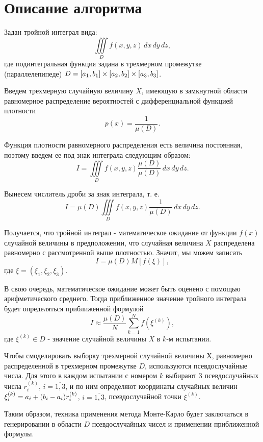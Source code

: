 \documentclass{report}
\begin{document}
\section*{Описание алгоритма}
\par Задан тройной интеграл вида:
$$\iiint\limits_D f(x,y,z) \,dx\,dy\,dz, $$
где подинтегральная функция задана в трехмерном промежутке (параллелепипеде) $D=[a_1,b_1]\times\*[a_2,b_2]\times[a_3,b_3]$.
\par Введем трехмерную случайную величину $X$, имеющую в замкнутной области равномерное распределение вероятностей с дифференциальной функцией плотности
$$p(x)=\frac{1}{\mu(D)}.$$
\par Функция плотности равномерного распределения есть величина постоянная, поэтому введем ее под знак интеграла следующим образом:
$$I=\iiint\limits_D f(x,y,z)\frac{\mu(D)}{\mu(D)} \,dx\,dy\,dz.$$
\par Вынесем числитель дроби за знак интеграла, т. е.
$$I=\mu(D)\iiint\limits_D f(x,y,z)\frac{1}{\mu(D)} \,dx\,dy\,dz.$$
\par Получается, что тройной интеграл - математическое ожидание от функции $f(x)$ случайной величины в предположении, что случайная величина $X$ распределена равномерно с рассмотренной выше плотностью. Значит, мы можем записать
$$I=\mu(D)M[f(\xi)],$$
где $\xi=(\xi_1,\xi_2,\xi_3)$.
\par В свою очередь, математическое ожидание может быть оценено с помощью арифметического среднего. Тогда приближенное значение тройного интеграла будет определяться приближенной формулой
$$I\approx\frac{\mu(D)}{N}\sum\limits_{k=1}^N f(\xi^{(k)}),$$
где $\xi^{(k)} \in D$ - значение случайной величины $X$ в $k$-м испытании.
\par Чтобы смоделировать выборку трехмерной случайной величины $Х$, равномерно распределенной в трехмерном промежутке $D$, используются псевдослучайные числа. Для этого в каждом испытании с номером $k$ выбирают 3 псевдослучайных числа $r_i^{(k)}$, $i=\overline{1,3}$, и по ним определяют координаты случайных величин $\xi_i^{(k)}=a_i+(b_i-a_i)\*r_i^{(k)}$, $i=\overline{1,3}$, псевдослучайной точки $\xi^{(k)}$.
\par Таким образом, техника применения метода Монте-Карло будет заключаться в генерировании в области $D$ псевдослучайных чисел и применении приближенной формулы.
\newpage

\end{document}

